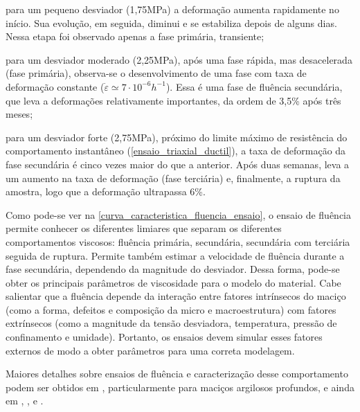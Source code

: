 \begin{alineas}
	
	\item para um pequeno desviador (1,75MPa) a deformação aumenta rapidamente no início. Sua evolução, em seguida, diminui e se estabiliza depois de alguns dias. Nessa etapa foi observado apenas a fase primária, transiente;
	
	\item para um desviador moderado (2,25MPa), após uma fase rápida, mas desacelerada (fase primária), observa-se o desenvolvimento de uma fase com taxa de deformação constante ($\dot{\varepsilon}\simeq 7\cdot {{10}^{-6}}{{h}^{-1}}$). Essa é uma fase de fluência secundária, que leva a deformações relativamente importantes, da ordem de 3,5\% após três meses;
	
	\item para um desviador forte (2,75MPa), próximo do limite máximo de resistência do comportamento instantâneo (\autoref{ensaio_triaxial_ductil}), a taxa de deformação da fase secundária é cinco vezes maior do que a anterior. Após duas semanas, leva a um aumento na taxa de deformação (fase terciária) e, finalmente, a ruptura da amostra, logo que a deformação ultrapassa 6\%.
	
\end{alineas}

Como pode-se ver na \autoref{curva_caracteristica_fluencia_ensaio}, o ensaio de fluência permite conhecer os diferentes limiares que separam os diferentes comportamentos viscosos: fluência primária, secundária, secundária com terciária seguida de ruptura. Permite também estimar a velocidade de fluência durante a fase secundária, dependendo da magnitude do desviador. Dessa forma, pode-se obter os principais parâmetros de viscosidade para o modelo do material. Cabe salientar que a fluência depende da interação entre fatores intrínsecos do maciço (como a forma, defeitos e composição da micro e macroestrutura) com fatores extrínsecos (como a magnitude da tensão desviadora, temperatura, pressão de confinamento e umidade). Portanto, os ensaios devem simular esses fatores externos de modo a obter parâmetros para uma correta modelagem.

Maiores detalhes sobre ensaios de fluência e caracterização desse comportamento podem ser obtidos em , particularmente para maciços argilosos profundos, e ainda em , ,  e .

